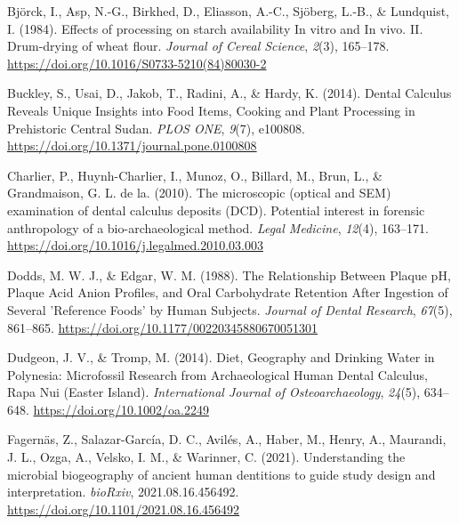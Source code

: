\documentclass[
  letterpaper,
]{book}
\newlength{\cslhangindent}
\newlength{\cslentryspacingunit} %
\newenvironment{CSLReferences}[2] %
 {%
  \setlength{\parindent}{0pt}
  \ifodd #1
  \let\oldpar\par
  \def\par{\hangindent=\cslhangindent\oldpar}
  \fi
  \setlength{\parskip}{#2\cslentryspacingunit}
 }%
 {}
\begin{document}
\hypertarget{refs-9}{}
\begin{CSLReferences}{1}{0}
\leavevmode{}%
Björck, I., Asp, N.-G., Birkhed, D., Eliasson, A.-C., Sjöberg, L.-B., \&
Lundquist, I. (1984). Effects of processing on starch availability {In}
vitro and {In} vivo. {II}. {Drum-drying} of wheat flour. \emph{Journal
of Cereal Science}, \emph{2}(3), 165--178.
\url{https://doi.org/10.1016/S0733-5210(84)80030-2}

\leavevmode{}%
Buckley, S., Usai, D., Jakob, T., Radini, A., \& Hardy, K. (2014).
Dental {Calculus Reveals Unique Insights} into {Food Items}, {Cooking}
and {Plant Processing} in {Prehistoric Central Sudan}. \emph{PLOS ONE},
\emph{9}(7), e100808. \url{https://doi.org/10.1371/journal.pone.0100808}

\leavevmode{}%
Charlier, P., Huynh-Charlier, I., Munoz, O., Billard, M., Brun, L., \&
Grandmaison, G. L. de la. (2010). The microscopic (optical and {SEM})
examination of dental calculus deposits ({DCD}). {Potential} interest in
forensic anthropology of a bio-archaeological method. \emph{Legal
Medicine}, \emph{12}(4), 163--171.
\url{https://doi.org/10.1016/j.legalmed.2010.03.003}

\leavevmode{}%
Dodds, M. W. J., \& Edgar, W. M. (1988). The {Relationship Between
Plaque pH}, {Plaque Acid Anion Profiles}, and {Oral Carbohydrate
Retention After Ingestion} of {Several} '{Reference Foods}' by {Human
Subjects}. \emph{Journal of Dental Research}, \emph{67}(5), 861--865.
\url{https://doi.org/10.1177/00220345880670051301}

\leavevmode{}%
Dudgeon, J. V., \& Tromp, M. (2014). Diet, {Geography} and {Drinking
Water} in {Polynesia}: {Microfossil Research} from {Archaeological Human
Dental Calculus}, {Rapa Nui} ({Easter Island}). \emph{International
Journal of Osteoarchaeology}, \emph{24}(5), 634--648.
\url{https://doi.org/10.1002/oa.2249}

\leavevmode{}%
Fagernäs, Z., Salazar-García, D. C., Avilés, A., Haber, M., Henry, A.,
Maurandi, J. L., Ozga, A., Velsko, I. M., \& Warinner, C. (2021).
Understanding the microbial biogeography of ancient human dentitions to
guide study design and interpretation. \emph{bioRxiv},
2021.08.16.456492. \url{https://doi.org/10.1101/2021.08.16.456492}


\end{CSLReferences}
\end{document}
